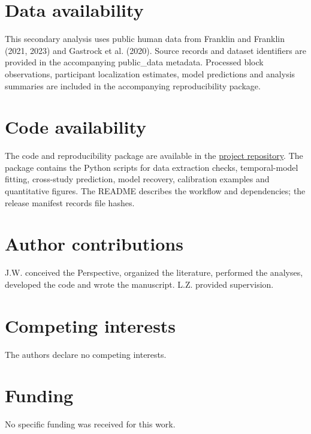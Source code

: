 \documentclass[11pt,a4paper]{article}
\begin{document}
\section{Data availability}
This secondary analysis uses public human data from Franklin and Franklin (2021, 2023) and Gastrock et al. (2020). Source records and dataset identifiers are provided in the accompanying public\_data metadata. Processed block observations, participant localization estimates, model predictions and analysis summaries are included in the accompanying reproducibility package. \cite{franklin2021,franklin2023,external2020}
\section{Code availability}
The code and reproducibility package are available in the \href{https://github.com/WUJIAHAO-HKU/Shared-and-separable-motor-learning-reconciling-transfer-dissociation-and-error-attribution}{project repository}. The package contains the Python scripts for data extraction checks, temporal-model fitting, cross-study prediction, model recovery, calibration examples and quantitative figures. The README describes the workflow and dependencies; the release manifest records file hashes.
\section{Author contributions}
J.W. conceived the Perspective, organized the literature, performed the analyses, developed the code and wrote the manuscript. L.Z. provided supervision.
\section{Competing interests}
The authors declare no competing interests.
\section{Funding}
No specific funding was received for this work.

\begingroup\fontsize{8.5}{9.6}\selectfont\setlength{\parskip}{0pt}\setlength{\bibsep}{0pt}\endgroup
\end{document}
